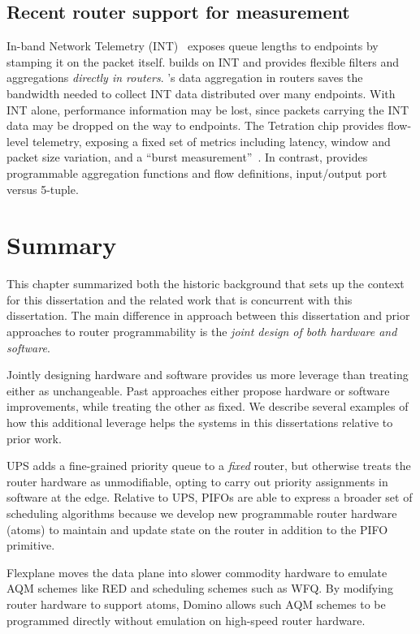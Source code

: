 \subsection{Recent router support for measurement} In-band Network Telemetry
(INT)~\cite{int, tpp} exposes queue lengths to endpoints by stamping it on the
packet itself. \TheSystem builds on INT and provides flexible filters and
aggregations {\em directly in routers}.  \TheSystem's data aggregation in
routers saves the bandwidth needed to collect INT data distributed over many
endpoints. With INT alone, performance information may be lost, since packets
carrying the INT data may be dropped on the way to endpoints. The Tetration
chip provides flow-level telemetry, exposing a fixed set of metrics including
latency, window and packet size variation, and a ``burst
measurement''~\cite{tetration-telemetry}. In contrast, \TheSystem provides
programmable aggregation functions and flow definitions, \eg input/output port
versus 5-tuple.

\section{Summary}
This chapter summarized both the historic background that sets up the context
for this dissertation and the related work that is concurrent with this
dissertation. The main difference in approach between this dissertation and
prior approaches to router programmability is the {\em joint design of both
hardware and software}.

Jointly designing hardware and software provides us more leverage than treating
either as unchangeable. Past approaches either propose hardware or software
improvements, while treating the other as fixed. We describe several examples
of how this additional leverage helps the systems in this dissertations
relative to prior work.

 UPS adds a fine-grained priority queue to a
{\em fixed} router, but otherwise treats the router hardware as unmodifiable,
opting to carry out priority assignments in software at the edge. Relative to
UPS, PIFOs are able to express a broader set of scheduling algorithms because
we develop new programmable router hardware (atoms) to maintain and update
state on the router in addition to the PIFO primitive.

 Flexplane moves the data plane into slower commodity hardware
to emulate AQM schemes like RED and scheduling schemes such as WFQ. By
modifying router hardware to support atoms,  Domino allows such AQM schemes to
be programmed directly without emulation on high-speed router hardware.


